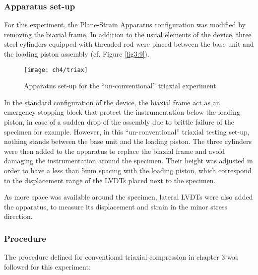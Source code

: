 \subsubsection{Apparatus set-up}

For this experiment, the Plane-Strain Apparatus configuration was modified by removing the biaxial frame. In addition to the usual elements of the device, three steel cylinders equipped with threaded rod were placed between the base unit and the loading piston assembly (cf. Figure \ref{fig3:9}). 

\begin{figure}[tb]
    \centering
    \texttt{[image: ch4/triax]}
    \caption{Apparatus set-up for the “un-conventional” triaxial experiment}
    \label{fig4:9}
\end{figure} 

In the standard configuration of the device, the biaxial frame act as an emergency stopping block that protect the instrumentation below the loading piston, in case of a sudden drop of the assembly due to brittle failure of the specimen for example. However, in this “un-conventional” triaxial testing set-up, nothing stands between the base unit and the loading piston. The three cylinders were then added to the apparatus to replace the biaxial frame and avoid damaging the instrumentation around the specimen. Their height was adjusted in order to have a less than 5mm spacing with the loading piston, which correspond to the displacement range of the LVDTs placed next to the specimen. 

As more space was available around the specimen, lateral LVDTs were also added the apparatus, to measure its displacement and strain in the minor stress direction. 

\subsubsection{Procedure}

The procedure defined for conventional triaxial compression in chapter 3 was followed for this experiment:  

